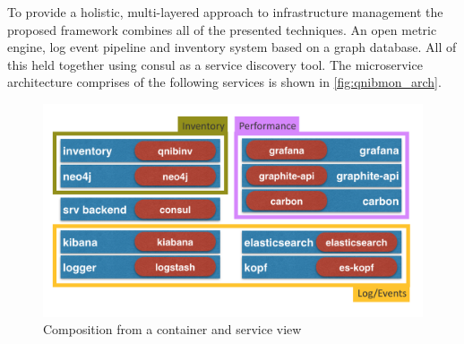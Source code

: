 To provide a holistic, multi-layered approach to infrastructure management the proposed framework combines all of the presented techniques.
An open metric engine, log event pipeline and inventory system based on a graph database. All of this held together using consul as a service discovery
tool.
The microservice architecture comprises of the following services is shown in \autoref{fig:qnibmon_arch}.
\begin{figure}[!ht]
    \includegraphics[width=.4\textwidth]{images/png/qnibmon_arch.png}
    \caption{\label{fig:qnibmon_arch}Composition from a container and service view}
\end{figure}
